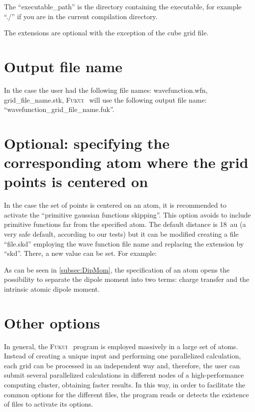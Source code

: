 \documentclass[a4paper,11pt,openany]{memoir}
\newcommand\programa{\textsc{Fukui}}
\begin{document}
The ``executable\_path'' is the directory containing the executable, for example ``./'' if you are in the current compilation directory.

The extensions are optional with the exception of the cube grid file.

\section{Output file name}
In the case the user had the following file names: wavefunction.wfn, grid\_file\_name.stk, \programa~ will use the following output file name: ``wavefunction\_grid\_file\_name.fuk''.

\section{Optional: specifying the corresponding atom where the grid points is centered on}\label{sec:gauss.skip}
In the case the set of points is centered on an atom, it is recommended to activate the ``primitive gaussian functions skipping''. This option avoids to include primitive functions far from the specified atom. The default distance is \SI{18}{au} (a very safe default, according to our tests) but it can be modified creating a file ``file.skd'' employing the wave function file name and replacing the extension by ``skd''. There, a new value can be set. For example:

As can be seen in \autoref{subsec:DipMom}, the specification of an atom opens the possibility to separate the dipole moment into two terms: charge transfer and the intrinsic atomic dipole moment.

\section{Other options}
In general, the \programa~ program is employed massively in a large set of atoms. Instead of creating a unique input and performing one parallelized calculation, each grid can be processed in an independent way and, therefore, the user can submit several parallelized calculations in different nodes of a high-performance computing cluster, obtaining faster results. In this way, in order to facilitate the common options for the different files, the program reads or detects the existence of files to activate its options.
\end{document}
